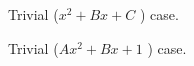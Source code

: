 \documentclass[12pt, a4paper, addpoints]{exam}
\begin{document}
\begin{questions}



\question Trivial  ($x^2 +Bx +C$ )   case. 
\setlength{\columnsep}{20pt}
\begin{multicols}{3}
\end{multicols}
\vspace{25mm}



\question Trivial  ($Ax^2 +Bx +1$ )   case. 
\setlength{\columnsep}{20pt}
\begin{multicols}{3}
\end{multicols}
\end{questions}
\end{document}
